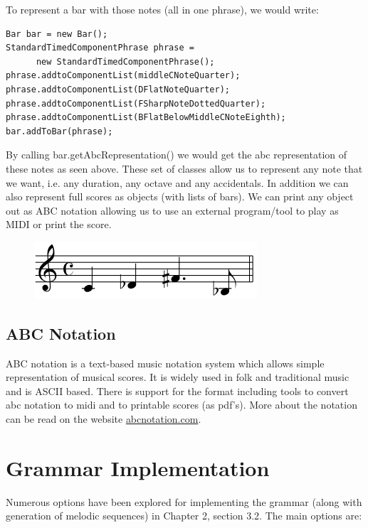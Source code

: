 \documentclass[pdftex,12pt,a4paper]{report}
\begin{document}
To represent a bar with those notes (all in one phrase), we would write:

\begin{lstlisting}
Bar bar = new Bar();
StandardTimedComponentPhrase phrase = 
      new StandardTimedComponentPhrase();
phrase.addtoComponentList(middleCNoteQuarter);
phrase.addtoComponentList(DFlatNoteQuarter);
phrase.addtoComponentList(FSharpNoteDottedQuarter);
phrase.addtoComponentList(BFlatBelowMiddleCNoteEighth);
bar.addToBar(phrase);

\end{lstlisting}

By calling bar.getAbcRepresentation() we would get the abc representation of these notes as seen above.
These set of classes allow us to represent any note that we want, i.e. any duration, any octave and any accidentals. In addition we can also represent full scores as objects (with lists of bars). We can print any object out as ABC notation allowing us to use an external program/tool to play as MIDI or print the score.

\begin{figure}[here]
  \centering
  \includegraphics[scale=0.6]{figure/abcnotationexample.png}
  \label{fig:abcnotationexample}
\end{figure}

\subsection{ABC Notation}
ABC notation is a text-based music notation system which allows simple representation of musical scores. It is widely used in folk and traditional music and is ASCII based. There is support for the format including tools to convert abc notation to midi and to printable scores (as pdf's). More about the notation can be read on the website \url{abcnotation.com}.

\section{Grammar Implementation}
Numerous options have been explored for implementing the grammar (along with generation of melodic sequences) in Chapter 2, section 3.2. The main options are:
\end{document}
